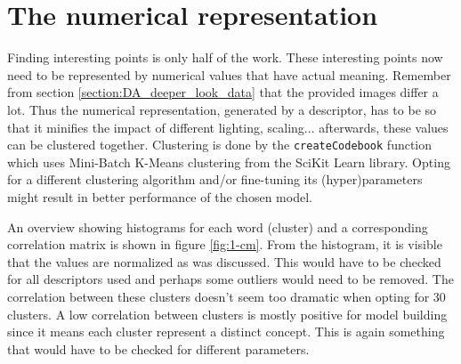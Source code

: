 
\section{The numerical representation}
\label{section:DA_numerical_representation}

Finding interesting points is only half of the work.
These interesting points now need to be represented by numerical values that have actual meaning.
Remember from section \ref{section:DA_deeper_look_data} that the provided images differ a lot.
Thus the numerical representation, generated by a descriptor, has to be so that it minifies the impact of different lighting, scaling...
afterwards, these values can be clustered together.
Clustering is done by the \texttt{createCodebook} function which uses Mini-Batch K-Means clustering from the SciKit Learn library.
Opting for a different clustering algorithm and/or fine-tuning its (hyper)parameters might result in better performance of the chosen model.

An overview showing histograms for each word (cluster) and a corresponding correlation matrix is shown in figure \ref{fig:1-cm}.
From the histogram, it is visible that the values are normalized as was discussed.
This would have to be checked for all descriptors used and perhaps some outliers would need to be removed.
The correlation between these clusters doesn't seem too dramatic when opting for 30 clusters.
A low correlation between clusters is mostly positive for model building since it means each cluster represent a distinct concept.
This is again something that would have to be checked for different parameters.

